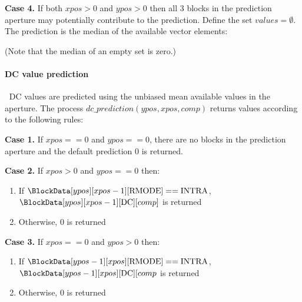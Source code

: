 {\bf Case 4.} If both $xpos>0$ and $ypos>0$ then all 3 blocks in the prediction aperture may potentially
contribute to the prediction. Define the set $values=\emptyset$. The prediction is the 
median of the available vector elements:

\begin{pseudo*}
    \bsIF{\BlockData[ypos][xpos-1][\GMode]==\false}
        \bsIF{\BlockData[ypos][xpos-1][\RMode][ref]==\true}
        \bsEND
    \bsEND
    \bsIF{\BlockData[ypos-1][xpos][\GMode]==\false}
        \bsIF{\BlockData[ypos-1][xpos][\RMode][ref]==\true}
        \bsEND
    \bsEND
    \bsIF{\BlockData[ypos-1][xpos-1][\GMode]==\false}
        \bsIF{\BlockData[ypos-1][xpos-1][\RMode][ref]==\true}
        \bsEND
    \bsEND

\bsEND
\end{pseudo*}

(Note that the median of an empty set is zero.)

\paragraph{DC value prediction}
\label{dcprediction}
$\ $\newline
DC values are predicted using the unbiased mean available values in the aperture. The
process $dc\_prediction(ypos, xpos, comp)$ returns values according to
the following rules:

{\bf Case 1.}  If $xpos==0$ and $ypos==0$, there are no blocks in the prediction aperture and
the default prediction 0 is returned.

{\bf Case 2.} If $xpos>0$ and $ypos==0$ then:
\begin{enumerate}
   \item If $\BlockData[ypos][xpos-1][\RMode]==\Intra$, $\BlockData[ypos][xpos-1][\DC][comp]$ is returned
   \item Otherwise, 0 is returned
\end{enumerate}

{\bf Case 3.} If $xpos==0$ and $ypos>0$ then:
\begin{enumerate}
   \item If $\BlockData[ypos-1][xpos][\RMode]==\Intra$, $\BlockData[ypos-1][xpos][\DC][comp$ is returned
   \item Otherwise, 0 is returned
\end{enumerate}


